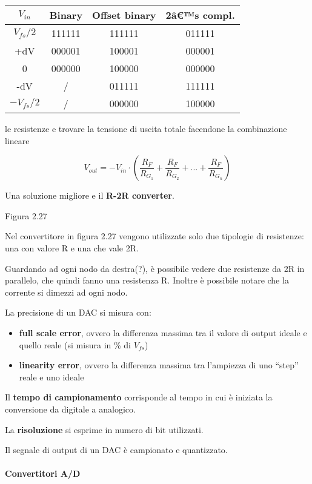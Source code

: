 \documentclass[
]{article}
\providecommand{\tightlist}{%
  \setlength{\itemsep}{0pt}\setlength{\parskip}{0pt}}
\begin{document}
\begin{table} \begin{tabular}{c|c|c|c} $V_{in}$ & Binary & Offset binary & 2â€™s compl. \\
\hline $V_{fs}/2$ & 111111 & 111111 & 011111 \\ +dV & 000001 & 100001 & 000001 \\ 0 & 000000
& 100000 & 000000 \\ -dV & / & 011111 & 111111 \\ $-V_{fs}/2$ & / & 000000 & 100000 \\
\end{tabular} \end{table}

le resistenze e trovare la tensione di uscita totale facendone la
combinazione lineare

\[V_{out}=-V_{in}\cdot\left(\frac{R_{F}}{R_{G_{1}}}+\frac{R_{F}}{R_{G_{2}}}+...+
\frac{R_{F}}{R_{G_{n}}}\right)\]

Una soluzione migliore e il \textbf{R-2R converter}.

Figura 2.27

Nel convertitore in figura 2.27 vengono utilizzate solo due tipologie di
resistenze: una con valore R e una che vale 2R.

Guardando ad ogni nodo da destra(?), è possibile vedere due resistenze
da 2R in parallelo, che quindi fanno una resistenza R. Inoltre è
possibile notare che la corrente si dimezzi ad ogni nodo.

La precisione di un DAC si misura con:

\begin{itemize}
\tightlist
\item
  \textbf{full scale error}, ovvero la differenza massima tra il valore
  di output ideale e quello reale (si misura in \% di \(V_{fs}\))
\item
  \textbf{linearity error}, ovvero la differenza massima tra l'ampiezza
  di uno ``step'' reale e uno ideale
\end{itemize}

Il \textbf{tempo di campionamento} corrisponde al tempo in cui è
iniziata la conversione da digitale a analogico.

La \textbf{risoluzione} si esprime in numero di bit utilizzati.

Il segnale di output di un DAC è campionato e quantizzato.

\paragraph{Convertitori A/D}\label{convertitori-ad}
\end{document}

